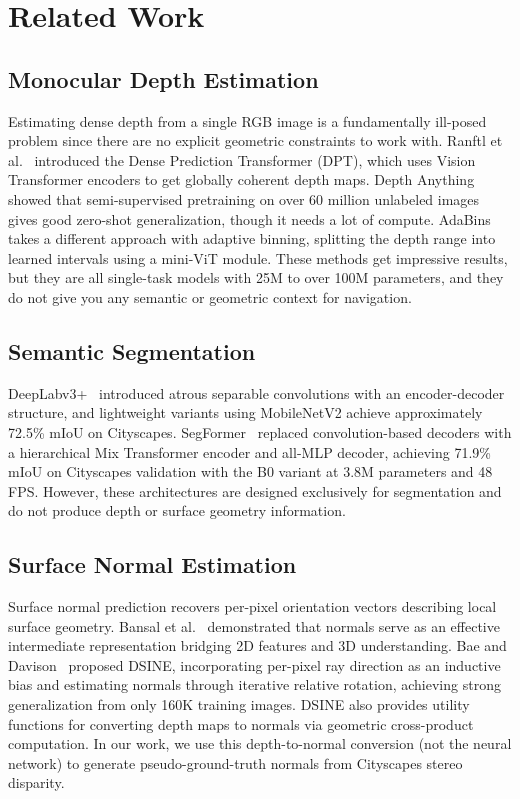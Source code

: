 \documentclass[journal, onecolumn]{IEEEtran}
\begin{document}
\section{Related Work}

\subsection{Monocular Depth Estimation}

Estimating dense depth from a single RGB image is a fundamentally ill-posed problem since there are no explicit geometric constraints to work with. Ranftl et al.~\cite{ranftl2021dense} introduced the Dense Prediction Transformer (DPT), which uses Vision Transformer encoders to get globally coherent depth maps. Depth Anything~\cite{yang2024depthanything} showed that semi-supervised pretraining on over 60 million unlabeled images gives good zero-shot generalization, though it needs a lot of compute. AdaBins~\cite{bhat2021adabins} takes a different approach with adaptive binning, splitting the depth range into learned intervals using a mini-ViT module. These methods get impressive results, but they are all single-task models with 25M to over 100M parameters, and they do not give you any semantic or geometric context for navigation.

\subsection{Semantic Segmentation}

DeepLabv3+~\cite{chen2018deeplabv3plus} introduced atrous separable convolutions with an encoder-decoder structure, and lightweight variants using MobileNetV2 achieve approximately 72.5\% mIoU on Cityscapes. SegFormer~\cite{xie2021segformer} replaced convolution-based decoders with a hierarchical Mix Transformer encoder and all-MLP decoder, achieving 71.9\% mIoU on Cityscapes validation with the B0 variant at 3.8M parameters and 48 FPS. However, these architectures are designed exclusively for segmentation and do not produce depth or surface geometry information.

\subsection{Surface Normal Estimation}

Surface normal prediction recovers per-pixel orientation vectors describing local surface geometry. Bansal et al.~\cite{bansal2016normal} demonstrated that normals serve as an effective intermediate representation bridging 2D features and 3D understanding. Bae and Davison~\cite{bae2024dsine} proposed DSINE, incorporating per-pixel ray direction as an inductive bias and estimating normals through iterative relative rotation, achieving strong generalization from only 160K training images. DSINE also provides utility functions for converting depth maps to normals via geometric cross-product computation. In our work, we use this depth-to-normal conversion (not the neural network) to generate pseudo-ground-truth normals from Cityscapes stereo disparity.
\end{document}

